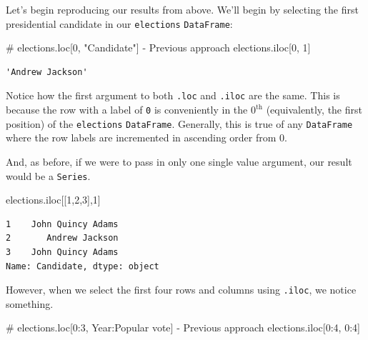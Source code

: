 \documentclass[
  letterpaper,
  DIV=11,
  numbers=noendperiod]{scrreprt}
\newenvironment{Shaded}{\begin{snugshade}}{\end{snugshade}}
\newcommand{\CommentTok}[1]{\textcolor[rgb]{0.37,0.37,0.37}{#1}}
\newcommand{\DecValTok}[1]{\textcolor[rgb]{0.68,0.00,0.00}{#1}}
\newcommand{\NormalTok}[1]{\textcolor[rgb]{0.00,0.23,0.31}{#1}}
\begin{document}
Let's begin reproducing our results from above. We'll begin by selecting
the first presidential candidate in our \texttt{elections}
\texttt{DataFrame}:

\begin{Shaded}
\begin{Highlighting}[]
\CommentTok{\# elections.loc[0, "Candidate"] {-} Previous approach}
\NormalTok{elections.iloc[}\DecValTok{0}\NormalTok{, }\DecValTok{1}\NormalTok{]}
\end{Highlighting}
\end{Shaded}

\begin{verbatim}
'Andrew Jackson'
\end{verbatim}

Notice how the first argument to both \texttt{.loc} and \texttt{.iloc}
are the same. This is because the row with a label of \texttt{0} is
conveniently in the \(0^{\text{th}}\) (equivalently, the first position)
of the \texttt{elections} \texttt{DataFrame}. Generally, this is true of
any \texttt{DataFrame} where the row labels are incremented in ascending
order from 0.

And, as before, if we were to pass in only one single value argument,
our result would be a \texttt{Series}.

\begin{Shaded}
\begin{Highlighting}[]
\NormalTok{elections.iloc[[}\DecValTok{1}\NormalTok{,}\DecValTok{2}\NormalTok{,}\DecValTok{3}\NormalTok{],}\DecValTok{1}\NormalTok{]}
\end{Highlighting}
\end{Shaded}

\begin{verbatim}
1    John Quincy Adams
2       Andrew Jackson
3    John Quincy Adams
Name: Candidate, dtype: object
\end{verbatim}

However, when we select the first four rows and columns using
\texttt{.iloc}, we notice something.

\begin{Shaded}
\begin{Highlighting}[]
\CommentTok{\# elections.loc[0:3, \textquotesingle{}Year\textquotesingle{}:\textquotesingle{}Popular vote\textquotesingle{}] {-} Previous approach}
\NormalTok{elections.iloc[}\DecValTok{0}\NormalTok{:}\DecValTok{4}\NormalTok{, }\DecValTok{0}\NormalTok{:}\DecValTok{4}\NormalTok{]}
\end{Highlighting}
\end{Shaded}
\end{document}
